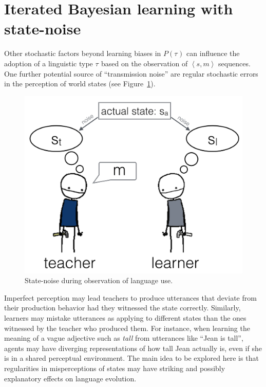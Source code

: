\documentclass[10pt,a4paper]{article}
\newcommand{\tuple}[1]{\ensuremath{\left\langle #1 \right\rangle}}
\newcommand{\type}[1]{\ensuremath{\tau_{#1}}}
\begin{document}

\section{Iterated Bayesian learning with state-noise}

Other stochastic factors beyond learning biases in $P(\type{})$ can influence the adoption of a
linguistic type $\type{}$ based on the observation of $\tuple{s,m}$ sequences. One further potential source
of ``transmission noise'' are regular stochastic errors in the perception of world states (see
Figure~\ref{fig:cartoon}).
%
\begin{figure}[t]
  \centering
  \includegraphics[width = 0.75\linewidth]{pics/cartoon_picture.png}
  \caption{State-noise during observation of language use.}
  \label{fig:cartoon}
\end{figure}
% 
Imperfect perception may lead teachers to produce utterances that deviate from
their production behavior had they witnessed the state correctly. Similarly, learners may
mistake utterances as applying to different states than the ones witnessed by the teacher who
produced them. For instance, when learning the meaning of a vague adjective such as {\em tall}
from utterances like ``Jean is tall'', agents may have diverging representations of how tall
Jean actually is, even if she is in a shared perceptual environment. The main idea to be
explored here is that regularities in misperceptions of states may have striking and possibly
explanatory effects on language evolution.
\end{document}
